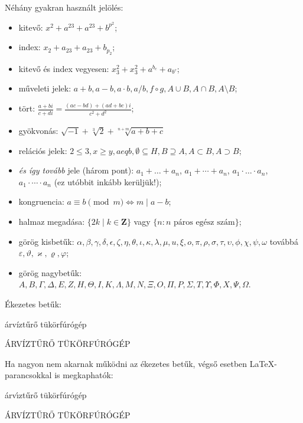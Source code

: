 \documentclass[a4paper]{article}
\begin{document}
Néhány gyakran használt jelölés:
\begin{itemize} %

\item kitevő: %
$x^2+a^23+a^{23}+b^{p^2}$;

\item index: 
$x_2+a_23+a_{23}+b_{p_2}$;

\item kitevő és index vegyesen: 
$x_3^2+x^2_3+a^{b_c}+a_{b^c}$;

\item műveleti jelek: 
$a+b, a-b, a \cdot b, a/b, f \circ g, A \cup B, A \cap B, A \setminus B$;

\item tört: 
$\frac{a+bi}{c+di}=\frac{(ac-bd)+(ad+bc)i}{c^2+d^2}$;

\item gyökvonás:
$\sqrt{-1}+\sqrt[3]{2}+\sqrt[n+m]{a+b+c}$

\item relációs jelek: 
$2 \leq 3, x \geq y, a 
eq b, \emptyset \subseteq H, B \supseteq A, A \subset B, A \supset B$;
\item \emph{és így tovább} jele (három pont): 
$a_1+ \ldots +a_n$,
$a_1+ \cdots +a_n$,
$a_1 \cdot\ldots\cdot a_n$,
$a_1 \cdot\cdots\cdot a_n$ (ez utóbbit inkább kerüljük!);

\item kongruencia: 
$a \equiv b \pmod m \iff m \mid a-b$;

\item halmaz megadása: $\{ 2k \mid k \in \mathbf{Z} \}$ vagy $\{ n : n \text{ páros egész szám} \}$;

\item görög kisbetűk:
$\alpha,\beta,\gamma,\delta,\epsilon,\zeta,\eta,\theta,\iota,\kappa,\lambda,\mu,
u,\xi,o,\pi,\rho,\sigma,\tau,\upsilon,\phi,\chi,\psi,\omega$ 
továbbá $\varepsilon,\vartheta,\varkappa,\varrho,\varphi$;

\item görög nagybetűk:
$A,B,\Gamma,\Delta,E,Z,H,\Theta,I,K,\Lambda,M,N,\Xi,O,\Pi,P,\Sigma,T,\Upsilon,\Phi,X,\Psi,\Omega$.

\end{itemize} %

\bigskip

Ékezetes betűk:

árvíztűrő tükörfúrógép

ÁRVÍZTŰRŐ TÜKÖRFÚRÓGÉP

Ha nagyon nem akarnak működni az ékezetes betűk, végső esetben LaTeX-parancsokkal is megkaphatók:

\'{a}rv\'{\i}zt\H{u}r\H{o} t\"{u}k\"{o}rf\'{u}r\'{o}g\'{e}p

\'{A}RV\'{I}ZT\H{U}R\H{O} T\"{U}K\"{O}RF\'{U}R\'{O}G\'{E}P
\end{document}
